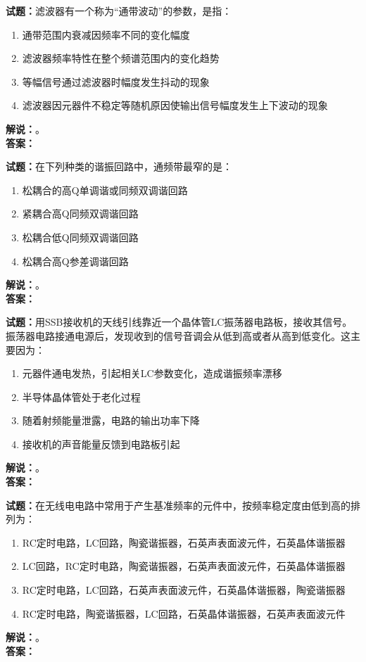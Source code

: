 \documentclass{ctexbook}
\begin{document}
\bigskip




\noindent\textbf{试题：}滤波器有一个称为“通带波动”的参数，是指：
\begin{enumerate}[leftmargin=3em]
\item 通带范围内衰减因频率不同的变化幅度
\item 滤波器频率特性在整个频谱范围内的变化趋势
\item 等幅信号通过滤波器时幅度发生抖动的现象
\item 滤波器因元器件不稳定等随机原因使输出信号幅度发生上下波动的现象
\end{enumerate}
\noindent\textbf{解说：}\textbf{}。\\\noindent\textbf{答案：}

\bigskip




\noindent\textbf{试题：}在下列种类的谐振回路中，通频带最窄的是：
\begin{enumerate}[leftmargin=3em]
\item 松耦合的高Q单调谐或同频双调谐回路
\item 紧耦合高Q同频双调谐回路
\item 松耦合低Q同频双调谐回路
\item 松耦合高Q参差调谐回路
\end{enumerate}
\noindent\textbf{解说：}\textbf{}。\\\noindent\textbf{答案：}

\bigskip




\noindent\textbf{试题：}用SSB接收机的天线引线靠近一个晶体管LC振荡器电路板，接收其信号。振荡器电路接通电源后，发现收到的信号音调会从低到高或者从高到低变化。这主要因为：
\begin{enumerate}[leftmargin=3em]
\item 元器件通电发热，引起相关LC参数变化，造成谐振频率漂移
\item 半导体晶体管处于老化过程
\item 随着射频能量泄露，电路的输出功率下降
\item 接收机的声音能量反馈到电路板引起
\end{enumerate}
\noindent\textbf{解说：}\textbf{}。\\\noindent\textbf{答案：}

\bigskip




\noindent\textbf{试题：}在无线电电路中常用于产生基准频率的元件中，按频率稳定度由低到高的排列为：
\begin{enumerate}[leftmargin=3em]
\item RC定时电路，LC回路，陶瓷谐振器，石英声表面波元件，石英晶体谐振器
\item LC回路，RC定时电路，陶瓷谐振器，石英声表面波元件，石英晶体谐振器
\item RC定时电路，LC回路，石英声表面波元件，石英晶体谐振器，陶瓷谐振器
\item RC定时电路，陶瓷谐振器，LC回路，石英晶体谐振器，石英声表面波元件
\end{enumerate}
\noindent\textbf{解说：}\textbf{}。\\\noindent\textbf{答案：}
\end{document}

